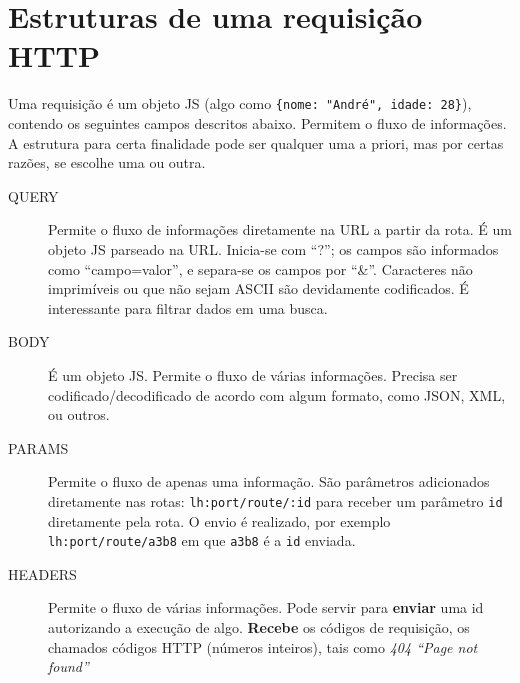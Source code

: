 \documentclass[12pt,a4paper]{article}
\begin{document}
\section{Estruturas de uma requisição HTTP}
Uma requisição é um objeto JS (algo como \verb|{nome: "André", idade: 28}|), contendo os seguintes campos descritos abaixo. Permitem o fluxo de informações. A estrutura para certa finalidade pode ser qualquer uma a priori, mas por certas razões, se escolhe uma ou outra.

\begin{description}
\item[QUERY] Permite o fluxo de informações diretamente na URL a partir da rota. É um objeto JS parseado na URL. Inicia-se com ``?''; os campos são informados como ``campo=valor'', e separa-se os campos por ``\&''. Caracteres não imprimíveis ou que não sejam ASCII são devidamente codificados. É interessante para filtrar dados em uma busca.

\item[BODY] É um objeto JS. Permite o fluxo de várias informações. Precisa ser codificado/decodificado de acordo com algum formato, como JSON, XML, ou outros. 

\item[PARAMS] Permite o fluxo de apenas uma informação. São parâmetros adicionados diretamente nas rotas: \verb|lh:port/route/:id| para receber um parâmetro \verb|id| diretamente pela rota. O envio é realizado, por exemplo \verb|lh:port/route/a3b8| em que \verb|a3b8| é a \verb|id| enviada.

\item[HEADERS] Permite o fluxo de várias informações. Pode servir para \textbf{enviar} uma id autorizando a execução de algo. \textbf{Recebe} os códigos de requisição, os chamados códigos HTTP (números inteiros), tais como \emph{404 ``Page not found''}
\end{description}
\end{document}

